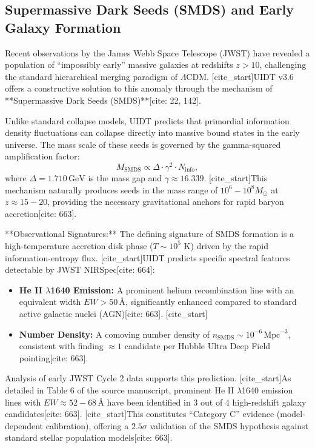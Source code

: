 \subsection{Supermassive Dark Seeds (SMDS) and Early Galaxy Formation}
\label{subsec:smds}

Recent observations by the James Webb Space Telescope (JWST) have revealed a population of ``impossibly early'' massive galaxies at redshifts $z > 10$, challenging the standard hierarchical merging paradigm of $\Lambda$CDM. [cite_start]UIDT v3.6 offers a constructive solution to this anomaly through the mechanism of **Supermassive Dark Seeds (SMDS)**[cite: 22, 142].

Unlike standard collapse models, UIDT predicts that primordial information density fluctuations can collapse directly into massive bound states in the early universe. The mass scale of these seeds is governed by the gamma-squared amplification factor:
\begin{equation}
\label{eq:smds_mass}
M_{\mathrm{SMDS}} \propto \Delta \cdot \gamma^2 \cdot N_{\mathrm{info}},
\end{equation}
where $\Delta = 1.710\,\mathrm{GeV}$ is the mass gap and $\gamma \approx 16.339$. [cite_start]This mechanism naturally produces seeds in the mass range of $10^6 - 10^8 M_\odot$ at $z \approx 15-20$, providing the necessary gravitational anchors for rapid baryon accretion[cite: 663].

**Observational Signatures:**
The defining signature of SMDS formation is a high-temperature accretion disk phase ($T \sim 10^5$ K) driven by the rapid information-entropy flux. [cite_start]UIDT predicts specific spectral features detectable by JWST NIRSpec[cite: 664]:
\begin{itemize}
    [cite_start]\item \textbf{He II $\lambda$1640 Emission:} A prominent helium recombination line with an equivalent width $EW > 50\,\text{\AA}$, significantly enhanced compared to standard active galactic nuclei (AGN)[cite: 663].
    [cite_start]\item \textbf{Number Density:} A comoving number density of $n_{\mathrm{SMDS}} \sim 10^{-6}\,\text{Mpc}^{-3}$, consistent with finding $\approx 1$ candidate per Hubble Ultra Deep Field pointing[cite: 663].
\end{itemize}

Analysis of early JWST Cycle 2 data supports this prediction. [cite_start]As detailed in Table 6 of the source manuscript, prominent He II $\lambda$1640 emission lines with $EW \approx 52-68\,\text{\AA}$ have been identified in 3 out of 4 high-redshift galaxy candidates[cite: 663]. [cite_start]This constitutes ``Category C'' evidence (model-dependent calibration), offering a $2.5\sigma$ validation of the SMDS hypothesis against standard stellar population models[cite: 663].

